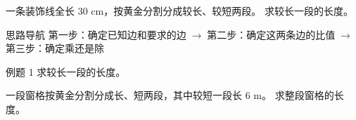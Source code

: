 \documentclass{exam-zh}
\begin{document}

\begin{eduProblemBlock}[例题 1]
一条装饰线全长 $30\text{ cm}$，按黄金分割分成较长、较短两段。
求较长一段的长度。

\end{eduProblemBlock}





\begin{eduAuxItem}{思路导航}
第一步：确定已知边和要求的边$\;\to\;$第二步：确定这两条边的比值$\;\to\;$第三步：确定乘还是除\end{eduAuxItem}




\begin{eduSubQuestionItem}{例题 1}
求较长一段的长度。\end{eduSubQuestionItem}

\begin{eduDualExplain}
  \begin{eduExplainLeft}
  \end{eduExplainLeft}

  \begin{eduExplainRight}
  \end{eduExplainRight}
\end{eduDualExplain}




\begin{eduProblemBlock}[例题 2]
一段窗格按黄金分割分成长、短两段，其中较短一段长 $6\text{ m}$。
求整段窗格的长度。

\end{eduProblemBlock}
\end{document}
